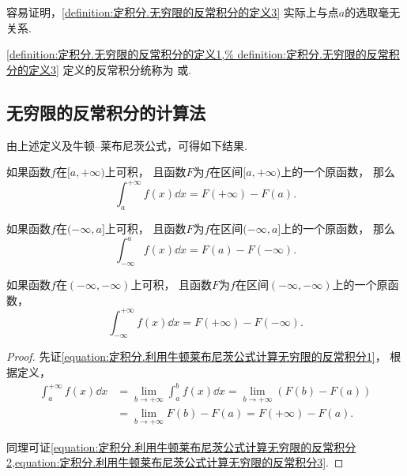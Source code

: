 容易证明，\cref{definition:定积分.无穷限的反常积分的定义3} 实际上与点\(a\)的选取毫无关系.

\cref{definition:定积分.无穷限的反常积分的定义1,%
definition:定积分.无穷限的反常积分的定义3}
定义的反常积分统称为%
或.

\subsection{无穷限的反常积分的计算法}
由上述定义及牛顿--莱布尼茨公式，可得如下结果.
\begin{theorem}\label{theorem:定积分.利用牛顿莱布尼茨公式计算无穷限的反常积分}
如果函数\(f\)在\([a,+\infty)\)上可积，
且函数\(F\)为\(f\)在区间\([a,+\infty)\)上的一个原函数，
那么\begin{equation}\label{equation:定积分.利用牛顿莱布尼茨公式计算无穷限的反常积分1}
	\int_a^{+\infty} f(x) \dd{x}
	= F(+\infty) - F(a).
\end{equation}

如果函数\(f\)在\((-\infty,a]\)上可积，
且函数\(F\)为\(f\)在区间\((-\infty,a]\)上的一个原函数，
那么\begin{equation}\label{equation:定积分.利用牛顿莱布尼茨公式计算无穷限的反常积分2}
	\int_{-\infty}^a f(x) \dd{x}
	= F(a) - F(-\infty).
\end{equation}

如果函数\(f\)在\((-\infty,-\infty)\)上可积，
且函数\(F\)为\(f\)在区间\((-\infty,-\infty)\)上的一个原函数，
\begin{equation}\label{equation:定积分.利用牛顿莱布尼茨公式计算无穷限的反常积分3}
	\int_{-\infty}^{+\infty} f(x) \dd{x}
	= F(+\infty) - F(-\infty).
\end{equation}
\begin{proof}
先证\cref{equation:定积分.利用牛顿莱布尼茨公式计算无穷限的反常积分1}，
根据定义，\begin{align*}
	\int_a^{+\infty} f(x) \dd{x}
	&= \lim_{b\to+\infty} \int_a^b f(x) \dd{x}
	= \lim_{b\to+\infty} (F(b) - F(a)) \\
	&= \lim_{b\to+\infty} F(b) - F(a)
	= F(+\infty) - F(a).
\end{align*}

同理可证\cref{equation:定积分.利用牛顿莱布尼茨公式计算无穷限的反常积分2,equation:定积分.利用牛顿莱布尼茨公式计算无穷限的反常积分3}.
\end{proof}
\end{theorem}

